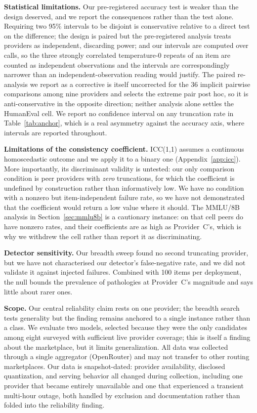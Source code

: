 \documentclass[11pt]{article}
\begin{document}
\textbf{Statistical limitations.} Our pre-registered accuracy test is
weaker than the design deserved, and we report the consequences rather
than the test alone. Requiring two 95\% intervals to be disjoint is
conservative relative to a direct test on the difference; the design
is paired but the pre-registered analysis treats providers as
independent, discarding power; and our intervals are computed over
calls, so the three strongly correlated temperature-0 repeats of an
item are counted as independent observations and the intervals are
correspondingly narrower than an independent-observation reading would
justify. The paired re-analysis we report as a corrective is itself
uncorrected for the 36 implicit pairwise comparisons among nine
providers and selects the extreme pair post hoc, so it is
anti-conservative in the opposite direction; neither analysis alone
settles the HumanEval cell. We report no confidence interval on any
truncation rate in Table~\ref{tab:anchor}, which is a real asymmetry
against the accuracy axis, where intervals are reported throughout.

\textbf{Limitations of the consistency coefficient.} ICC(1,1) assumes
a continuous homoscedastic outcome and we apply it to a binary one
(Appendix~\ref{app:icc}). More importantly, its discriminant validity
is untested: our only comparison condition is peer providers with
\emph{zero} truncations, for which the coefficient is undefined by
construction rather than informatively low. We have no condition with
a nonzero but item-independent failure rate, so we have not
demonstrated that the coefficient would return a low value where it
should. The MMLU/8B analysis in Section~\ref{sec:mmlu8b} is a
cautionary instance: on that cell peers do have nonzero rates, and
their coefficients are as high as Provider~C's, which is why we
withdrew the cell rather than report it as discriminating.

\textbf{Detector sensitivity.} Our breadth sweep found no second
truncating provider, but we have not characterised our detector's
false-negative rate, and we did not validate it against injected
failures. Combined with 100 items per deployment, the null bounds the
prevalence of pathologies at Provider~C's magnitude and says little
about rarer ones.

\textbf{Scope.} Our central reliability claim rests on one provider;
the breadth search tests generality but the finding remains anchored
to a single instance rather than a class. We evaluate two models,
selected because they were the only candidates among eight surveyed
with sufficient live provider coverage; this is itself a finding about
the marketplace, but it limits generalization. All data was collected
through a single aggregator (OpenRouter) and may not transfer to other
routing marketplaces. Our data is snapshot-dated: provider
availability, disclosed quantization, and serving behavior all changed
during collection, including one provider that became entirely
unavailable and one that experienced a transient multi-hour outage,
both handled by exclusion and documentation rather than folded into
the reliability finding.
\end{document}
